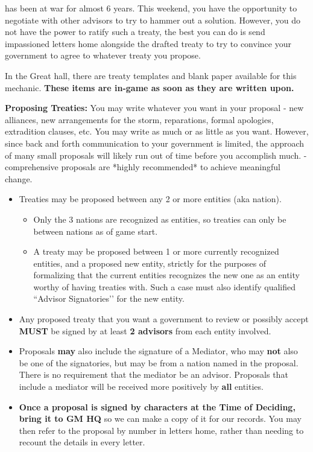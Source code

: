 \documentclass[green]{GL2020}
\begin{document}
\name{\gTreaty{}}

\pEarth{} has been at war for almost 6 years. This weekend, you have the opportunity to negotiate with other advisors to try to hammer out a solution. However, you do not have the power to ratify such a treaty, the best you can do is send impassioned letters home alongside the drafted treaty to try to convince your government to agree to whatever treaty you propose. 

In the Great hall, there are treaty templates and blank paper available for this mechanic. \textbf{These items are in-game as soon as they are written upon.}

\textbf{Proposing Treaties:}
You may write whatever you want in your proposal - new alliances, new arrangements for the storm, reparations, formal apologies, extradition clauses, etc. You may write as much or as little as you want. However, since back and forth communication to your government is limited, the approach of many small proposals will likely run out of time before you accomplish much. - comprehensive proposals are *highly recommended* to achieve meaningful change.
\begin{itemize}
  \item Treaties may be proposed between any 2 or more entities (aka nation). 
  \begin{itemize}
    \item Only the 3 nations are recognized as entities, so treaties can only be between nations as of game start.
    \item A treaty may be proposed between 1 or more currently recognized entities, and a proposed new entity, strictly for the purposes of formalizing that the current entities recognizes the new one as an entity worthy of having treaties with. Such a case must also identify qualified ``Advisor Signatories’’ for the new entity.
  \end{itemize}
  \item Any proposed treaty that you want a government to review or possibly accept \textbf{MUST} be signed by at least \textbf{2 advisors} from each entity involved.
  \item Proposals \textbf{may} also include the signature of a Mediator, who may \textbf{not} also be one of the signatories, but may be from a nation named in the proposal. There is no requirement that the mediator be an advisor. Proposals that include a mediator will be received more positively by \textbf{all} entities.
  \item \textbf{Once a proposal is signed by characters at the Time of Deciding, bring it to GM HQ} so we can make a copy of it for our records. You may then refer to the proposal by number in letters home, rather than needing to recount the details in every letter.
\end{itemize}
\end{document}
